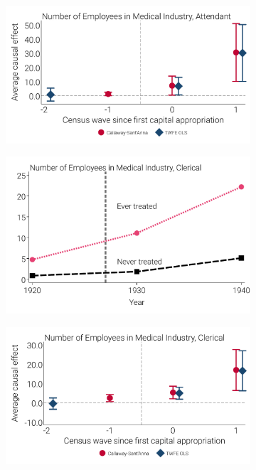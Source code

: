 \documentclass[12pt]{article}
\begin{document}
\begin{figure}[!ht]
\begin{minipage}{\linewidth}
\begin{subfigure}[b]{0.49\columnwidth}
  \end{subfigure}    
  \begin{subfigure}[b]{0.49\columnwidth}
    \includegraphics[width=\linewidth]{../analysis/output/appendix/figure_c3b2_event_study_hosp_staff_hosp_attendant.pdf}
    \end{subfigure}  
  \begin{subfigure}[b]{0.49\columnwidth}
    \includegraphics[width=.9\linewidth]{../analysis/output/appendix/figure_c3a3_med_profs_by_treatment_status_hosp_clerical.pdf}
  \end{subfigure}
  \begin{subfigure}[b]{0.49\columnwidth}
    \includegraphics[width=\linewidth]{../analysis/output/appendix/figure_c3b3_event_study_hosp_staff_hosp_clerical.pdf}

\end{subfigure}
\end{minipage}
\end{figure}
\end{document}
